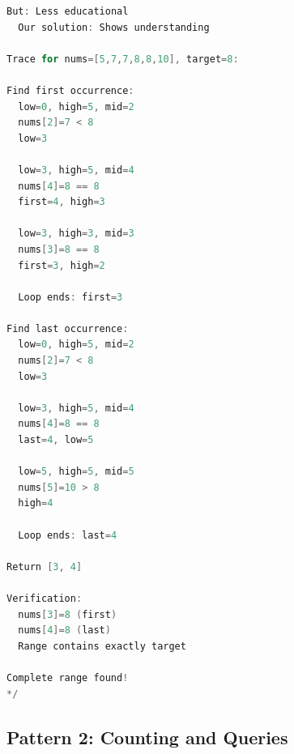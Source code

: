 \documentclass[11pt,a4paper,oneside]{book}
\begin{document}
\begin{lstlisting}[language=C++, caption=Complete Lower/Upper Bound Solutions]
  But: Less educational
  Our solution: Shows understanding

Trace for nums=[5,7,7,8,8,10], target=8:

Find first occurrence:
  low=0, high=5, mid=2
  nums[2]=7 < 8
  low=3
  
  low=3, high=5, mid=4
  nums[4]=8 == 8 
  first=4, high=3
  
  low=3, high=3, mid=3
  nums[3]=8 == 8 
  first=3, high=2
  
  Loop ends: first=3

Find last occurrence:
  low=0, high=5, mid=2
  nums[2]=7 < 8
  low=3
  
  low=3, high=5, mid=4
  nums[4]=8 == 8 
  last=4, low=5
  
  low=5, high=5, mid=5
  nums[5]=10 > 8
  high=4
  
  Loop ends: last=4

Return [3, 4] 

Verification:
  nums[3]=8 (first) 
  nums[4]=8 (last) 
  Range contains exactly target 

Complete range found!
*/
\end{lstlisting}

\subsection{Pattern 2: Counting and Queries}
\end{document}
